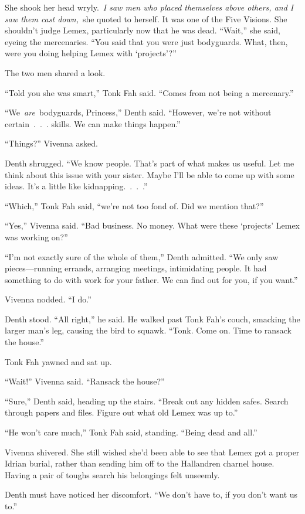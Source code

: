 She shook her head wryly.~\textit{I saw men who placed themselves above others, and I saw them cast down,}~she quoted to herself. It was one of the Five Visions. She shouldn’t judge Lemex, particularly now that he was dead. “Wait,” she said, eyeing the mercenaries. “You said that you were just bodyguards. What, then, were you doing helping Lemex with ‘projects’?”

The two men shared a look.

“Told you she was smart,” Tonk Fah said. “Comes from not being a mercenary.”

“We~\textit{are}~bodyguards, Princess,” Denth said. “However, we’re not without certain~.~.~. skills. We can make things happen.”

“Things?” Vivenna asked.

Denth shrugged. “We know people. That’s part of what makes us useful. Let me think about this issue with your sister. Maybe I’ll be able to come up with some ideas. It’s a little like kidnapping.~.~.~.”

“Which,” Tonk Fah said, “we’re not too fond of. Did we mention that?”

“Yes,” Vivenna said. “Bad business. No money. What were these ‘projects’ Lemex was working on?”

“I’m not exactly sure of the whole of them,” Denth admitted. “We only saw pieces—running errands, arranging meetings, intimidating people. It had something to do with work for your father. We can find out for you, if you want.”

Vivenna nodded. “I do.”

Denth stood. “All right,” he said. He walked past Tonk Fah’s couch, smacking the larger man’s leg, causing the bird to squawk. “Tonk. Come on. Time to ransack the house.”

Tonk Fah yawned and sat up.

“Wait!” Vivenna said. “Ransack the house?”

“Sure,” Denth said, heading up the stairs. “Break out any hidden safes. Search through papers and files. Figure out what old Lemex was up to.”

“He won’t care much,” Tonk Fah said, standing. “Being dead and all.”

Vivenna shivered. She still wished she’d been able to see that Lemex got a proper Idrian burial, rather than sending him off to the Hallandren charnel house. Having a pair of toughs search his belongings felt unseemly.

Denth must have noticed her discomfort. “We don’t have to, if you don’t want us to.”

